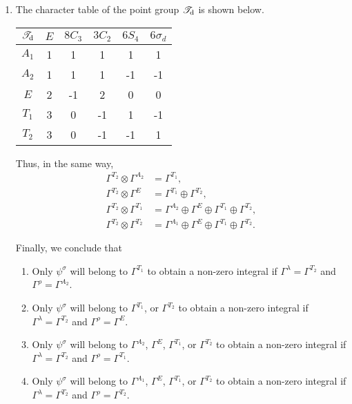 \documentclass[a4paper]{book}
\begin{document}
\begin{solution}
\begin{enumerate}[label=(\alph*)]
		\item The character table of the point group $\mathscr{T}_{\rm d}$ is shown below.
		\begin{center}
		\begin{tabular}{cccccc}\hline
	$\mathscr{T}_{\rm d}$ & $E$ & $8C_3$ & $3C_2$ & $6S_4$ & $6\sigma_d$ \\ \hline
			$A_1$	&	1	&	1	&	1	&	1	&	1	\\
			$A_2$	&	1	&	1	&	1	&	-1	&	-1	\\
			$E$		&	2	&	-1	&	2	&	0	&	0	\\
			$T_1$	&	3	&	0	&	-1	&	1	&	-1	\\
			$T_2$	&	3	&	0	&	-1	&	-1	&	1\\ \hline
		\end{tabular}
		\end{center}
		Thus, in the same way,
		\begin{align}
			\Gamma^{T_2} \otimes \Gamma^{A_2} &= \Gamma^{T_1} , \\
			\Gamma^{T_2} \otimes \Gamma^{E} &= \Gamma^{T_1} \oplus \Gamma^{T_2} , \\
			\Gamma^{T_2} \otimes \Gamma^{T_1} &= \Gamma^{A_2} \oplus \Gamma^{E} \oplus \Gamma^{T_1} \oplus \Gamma^{T_2} , \\
			\Gamma^{T_2} \otimes \Gamma^{T_2} &= \Gamma^{A_1} \oplus \Gamma^{E} \oplus \Gamma^{T_1} \oplus \Gamma^{T_2} .
		\end{align}
		
		Finally, we conclude that 
			\begin{enumerate}[label=(\arabic*)]
			
			\item Only $\psi^\sigma$ will belong to $\Gamma^{T_1}$ to obtain a non-zero integral if $\Gamma^\lambda = \Gamma^{T_2}$ and $\Gamma^\rho = \Gamma^{A_2}$.
			
			\item Only $\psi^\sigma$ will belong to $\Gamma^{T_1}$, or $\Gamma^{T_2}$ to obtain a non-zero integral if $\Gamma^\lambda = \Gamma^{T_2}$ and $\Gamma^\rho = \Gamma^{E}$.
				
			\item Only $\psi^\sigma$ will belong to $\Gamma^{A_2}$, $\Gamma^E$, $\Gamma^{T_1}$, or $\Gamma^{T_2}$ to obtain a non-zero integral if $\Gamma^\lambda = \Gamma^{T_2}$ and $\Gamma^\rho = \Gamma^{T_1}$.
				
			\item Only $\psi^\sigma$ will belong to $\Gamma^{A_1}$, $\Gamma^E$, $\Gamma^{T_1}$, or $\Gamma^{T_2}$ to obtain a non-zero integral if $\Gamma^\lambda = \Gamma^{T_2}$ and $\Gamma^\rho = \Gamma^{T_2}$.
			
			\end{enumerate}					
		
		\end{enumerate}
	
	\end{solution}
\end{document}
